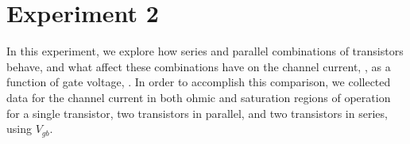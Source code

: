 \section*{Experiment 2}
In this experiment, we explore how series and parallel combinations of \nMOS transistors behave, 
and what affect these combinations have on the channel current, \Isat, as a function of gate voltage,
\Vg. In order to accomplish this comparison, we collected data for the channel current in both ohmic 
and saturation regions of operation for a single \nMOS transistor, two transistors in parallel, and
two transistors in series, using $V_{gb}$.